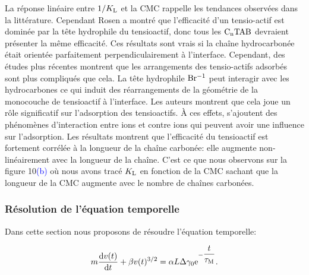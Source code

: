 \documentclass[french, 10pt]{article}
\begin{document}
La réponse linéaire entre $1/K_{\rm L}$ et la CMC rappelle les tendances observées dans la littérature. Cependant Rosen a montré que l'efficacité d'un tensio-actif est dominée par la tête hydrophile du tensioactif, donc tous les $\rm C_{\rm n}TAB$ devraient présenter la même efficacité. Ces résultats sont vrais si la chaîne hydrocarbonée était orientée parfaitement perpendiculairement à l'interface. Cependant, des études plus récentes montrent que les arrangements des tensio-actifs adsorbés sont plus compliqués que cela. La tête hydrophile $\rm Br^{-1}$ peut interagir avec les hydrocarbones ce qui induit des réarrangements de la géométrie de la monocouche de tensioactif à l'interface. Les auteurs montrent que cela joue un rôle significatif sur l'adsorption des tensioactifs. À ces effets, s'ajoutent des phénomènes d'interaction entre ions et contre ions qui peuvent avoir une influence sur l'adsorption. Les résultats montrent que l'efficacité du tensioactif est fortement corrélée à la longueur de la chaîne carbonée: elle augmente non-linéairement avec la longueur de la chaîne. C'est ce que nous observons sur la figure 10\textcolor{blue}{(b)} où nous avons tracé $K_{\rm L}$ en fonction de la CMC sachant que la longueur de la CMC augmente avec le nombre de chaînes carbonées.

\subsubsection{Résolution de l'équation temporelle}

Dans cette section nous proposons de résoudre l'équation temporelle: 

\begin{equation}
  m\frac{\mathrm{d}v(t)}{\mathrm{d}t} + \beta v(t)^{3/2} = \alpha L\Delta\gamma_0{\rm e}^{-\dfrac{t}{\tau_{\rm M}}}.
\end{equation}
\end{document}
